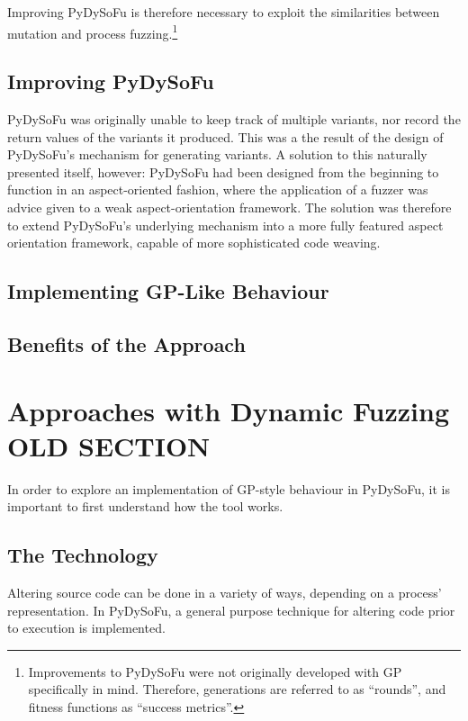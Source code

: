 \documentclass[draft,12pt]{llncs}   %
\begin{document}
Improving PyDySoFu is therefore necessary to exploit the similarities between mutation and process fuzzing.\footnote{Improvements to PyDySoFu were not originally developed with GP specifically in mind. Therefore, generations are referred to as ``rounds'', and fitness functions as ``success metrics''.}


\subsection{Improving PyDySoFu}
PyDySoFu was originally unable to keep track of multiple variants, nor record the return values of the variants it produced. This was a the result of the design of PyDySoFu's mechanism for generating variants. A solution to this naturally presented itself, however: PyDySoFu had been designed from the beginning to function in an aspect-oriented fashion, where the application of a fuzzer was advice given to a weak aspect-orientation framework. The solution was therefore to extend PyDySoFu's underlying mechanism into a more fully featured aspect orientation framework, capable of more sophisticated code weaving.


\subsection{Implementing GP-Like Behaviour}



\subsection{Benefits of the Approach}


\section{Approaches with Dynamic Fuzzing OLD SECTION}

In order to explore an implementation of GP-style behaviour in PyDySoFu, it is
important to first understand how the tool works.\par




\label{sec:dynamic_fuzzing}
\subsection{The Technology}
Altering source code can be done in a variety of ways, depending on a process'
representation. In PyDySoFu\cite{pydysofu}, a general purpose technique for altering
code prior to execution is implemented.\par
\end{document}

